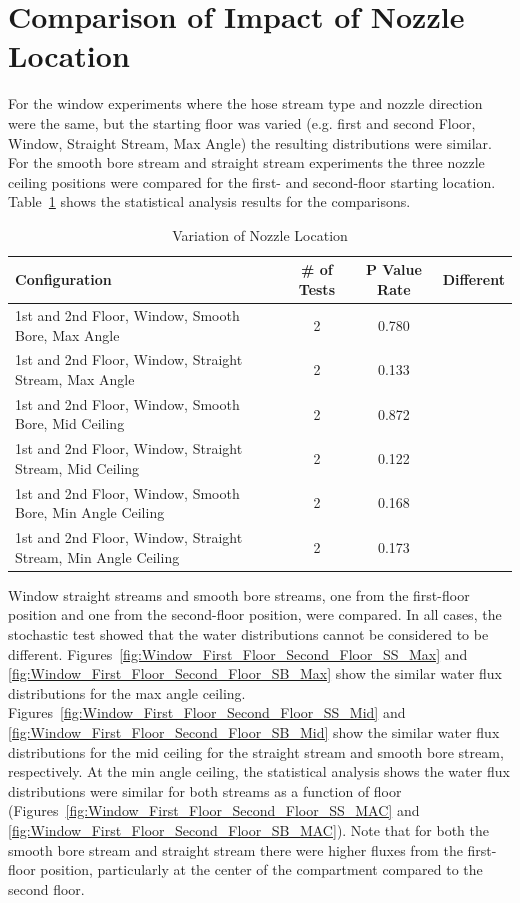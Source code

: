 \documentclass[12pt,oneside]{book}
\begin{document}
\clearpage

\section{Comparison of Impact of Nozzle Location}

For the window experiments where the hose stream type and nozzle direction were the same, but the starting floor was varied (e.g. first and second Floor, Window, Straight Stream, Max Angle) the resulting distributions were similar. For the smooth bore stream and straight stream experiments the three nozzle ceiling positions were compared for the first- and second-floor starting location. Table~\ref{tab:add_nozzlelocation} shows the statistical analysis results for the comparisons.

\begin{table}[!ht]
\centering
\small
\caption{Variation of Nozzle Location}
\label{tab:add_nozzlelocation}
\begin{tabular}{lccc}
\toprule[1.5pt]
Configuration & \# of Tests & P Value Rate & Different \\ 
\midrule
 1st and 2nd Floor, Window, Smooth Bore, Max Angle       & 2          & 0.780   &             \\
 1st and 2nd Floor, Window, Straight Stream, Max Angle   & 2          & 0.133   &             \\
 1st and 2nd Floor, Window, Smooth Bore, Mid Ceiling     & 2          & 0.872   &             \\
 1st and 2nd Floor, Window, Straight Stream, Mid Ceiling & 2          & 0.122   &             \\
 1st and 2nd Floor, Window, Smooth Bore, Min Angle Ceiling     & 2    & 0.168   &             \\
 1st and 2nd Floor, Window, Straight Stream, Min Angle Ceiling & 2    & 0.173   &             \\
\bottomrule[1.25pt]
\end{tabular}
\end{table}

Window straight streams and smooth bore streams, one from the first-floor position and one from the second-floor position, were compared. In all cases, the stochastic test showed that the water distributions cannot be considered to be different. Figures~\ref{fig:Window_First_Floor_Second_Floor_SS_Max} and \ref{fig:Window_First_Floor_Second_Floor_SB_Max} show the similar water flux distributions for the max angle ceiling. Figures~\ref{fig:Window_First_Floor_Second_Floor_SS_Mid} and \ref{fig:Window_First_Floor_Second_Floor_SB_Mid} show the similar water flux distributions for the mid ceiling for the straight stream and smooth bore stream, respectively. At the min angle ceiling, the statistical analysis shows the water flux distributions were similar for both streams as a function of floor (Figures~\ref{fig:Window_First_Floor_Second_Floor_SS_MAC} and \ref{fig:Window_First_Floor_Second_Floor_SB_MAC}). Note that for both the smooth bore stream and straight stream there were higher fluxes from the first-floor position, particularly at the center of the compartment compared to the second floor.
\end{document}
